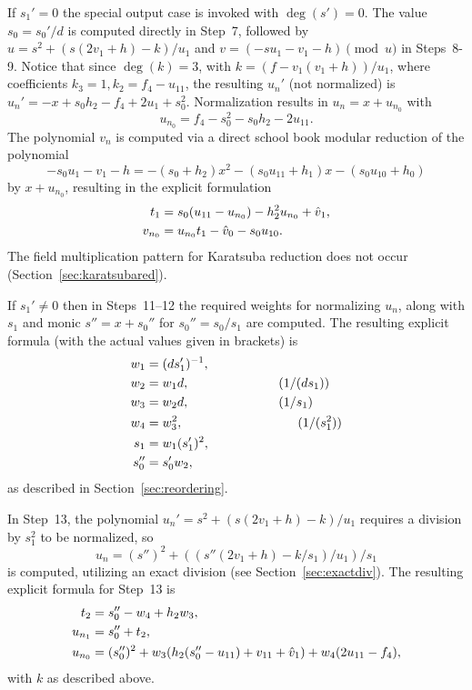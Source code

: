 If $s_1' = 0$ the special output case is invoked with $\deg(s') = 0$. The value
$s_0 = s_0'/d$ is computed directly in Step~7, followed by $u = s^2 + (s(2v_1 +
h) - k)/u_1$ and $v = (-su_1 - v_1 - h) \pmod{u}$ in Steps~8-9. Notice that
since $\deg(k) = 3$, with $k = (f - v_1(v_1 + h))/u_1$, where coefficients $k_3
= 1, k_2 = f_4 - u_{11}$, the resulting $u_n'$ (not normalized) is $u_n' = -x +
s_0h_2 - f_4 + 2u_1 + s_0^2.$ Normalization results in $u_n = x + u_{n_0}$ with
$$u_{n_0} = f_4 - s_0^2 - s_0h_2 - 2u_{11}.$$ The polynomial $v_n$ is computed
via a direct school book modular reduction of the polynomial $$-s_0u_1 - v_1 - h
= -(s_0 + h_2)x^2 - (s_0u_{11} + h_1)x - (s_0u_{10} + h_0)$$ by $x + u_{n_0}$,
resulting in the explicit formulation
\begin{align*} 
    t_1     &= s_0(u_{11} - u_{n_0}) - h_2^2u_{n_0} + \hat{v}_1,\\
    v_{n_0} &= u_{n_0}t_1 - \hat{v}_0 - s_0u_{10}.    
\end{align*} 
The field multiplication pattern for Karatsuba reduction does not occur
(Section~\ref{sec:karatsubared}).

If $s_1' \neq 0$ then in Steps~11--12 the required weights for normalizing $u_n$, along with
$s_1$ and monic $s'' = x + s_0''$ for $s_0'' = s_0/s_1$ are computed. The
resulting explicit formula (with the actual
values given in brackets) is
\begin{align*} 
    w_1 &= (ds_1')^{-1},\\
    w_2 &= w_1d, \quad\quad\quad\quad\quad\quad\quad (1/(ds_1))\\
    w_3 &= w_2d, \quad\quad\quad\quad\quad\quad\quad (1/s_1)\\
    w_4 &= w_3^2, \quad\quad\quad\quad\quad\quad\quad\quad\quad (1/(s_1^2))\\
    s_1 &= w_1(s_1')^2,\\
    s_0'' &= s_0'w_2, \end{align*} as described in Section~\ref{sec:reordering}. 

In Step~13, the polynomial $u_n' = s^2 + (s(2v_1 + h) - k)/u_1$ requires a
division by $s_1^2$ to be normalized, so 
$$ u_n = (s'')^2 + ((s''(2v_1+ h) - k/s_1)/u_1)/s_1$$ is computed, utilizing an
exact division (see Section~\ref{sec:exactdiv}). The resulting explicit formula
for Step~13 is 
\begin{align*}
    t_2 &= s_0''- w_4 + h_2w_3,\\
    u_{n_1} &= s_0'' + t_2,\\
    u_{n_0} &= (s_0'')^2 + w_3(h_2(s_0'' - u_{11}) + v_{11} + \hat{v}_1) + w_4(2u_{11} - f_4),
\end{align*}
with $k$ as described above. 

